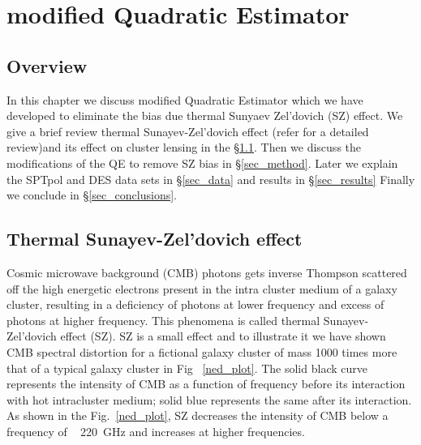 \chapter{modified Quadratic Estimator}
\label{ch:analysis}
\section*{Overview}\label{ovr}
In this chapter we discuss modified Quadratic Estimator which we have developed to eliminate the bias due thermal Sunyaev Zel'dovich (SZ) effect. 
We give a brief review thermal Sunayev-Zel'dovich effect (refer  for a detailed review)and its effect on cluster lensing in the \S\ref{tsz}.
Then we discuss the modifications of the QE to remove SZ bias in \S\ref{sec_method}.
 Later we explain the SPTpol and DES data sets in \S\ref{sec_data} and results in \S\ref{sec_results}
Finally we conclude in \S\ref{sec_conclusions}.


\section{Thermal Sunayev-Zel'dovich effect}\label{tsz}

 Cosmic microwave background (CMB) photons gets inverse Thompson scattered off the high energetic electrons present in the intra cluster medium of a galaxy cluster, resulting in a deficiency of photons at lower frequency and excess of photons at higher frequency. 
 This phenomena is called thermal Sunayev-Zel'dovich effect (SZ). 
 SZ is a small effect and to illustrate it we have shown CMB spectral distortion for a fictional galaxy cluster of mass 1000 times more that of a typical galaxy cluster in Fig ~\ref{ned_plot}.
 The solid black curve represents the intensity of CMB as a function of frequency before its interaction with hot intracluster medium; solid blue represents the same after its interaction.
 As shown in the Fig.~\ref{ned_plot}, SZ decreases the intensity of CMB below a frequency of ~ 220 \,GHz and increases at higher frequencies. 
   
